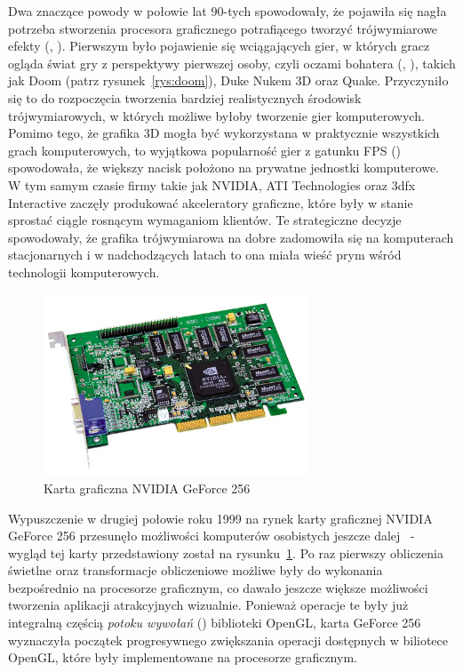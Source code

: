 Dwa znaczące powody w połowie lat 90-tych spowodowały, że pojawiła się nagła potrzeba stworzenia procesora graficznego potrafiącego tworzyć trójwymiarowe efekty (, ). Pierwszym było pojawienie się wciągających gier, w których gracz ogląda świat gry z perspektywy pierwszej osoby, czyli oczami bohatera (, ), takich jak Doom (patrz rysunek~\ref{rys:doom}), Duke Nukem 3D oraz Quake. Przyczyniło się to do rozpoczęcia tworzenia bardziej realistycznych środowisk trójwymiarowych, w których możliwe byłoby tworzenie gier komputerowych. Pomimo tego, że grafika 3D mogła być wykorzystana w praktycznie wszystkich grach komputerowych, to wyjątkowa popularność gier z gatunku FPS () spowodowała, że większy nacisk położono na prywatne jednostki komputerowe. W tym samym czasie firmy takie jak NVIDIA, ATI Technologies oraz 3dfx Interactive zaczęły produkować akceleratory graficzne, które były w stanie sprostać ciągle rosnącym wymaganiom klientów. Te strategiczne decyzje spowodowały, że grafika trójwymiarowa na dobre zadomowiła się na komputerach stacjonarnych i w nadchodzących latach to ona miała wieść prym wśród technologii komputerowych.

\begin{figure}[ht]
\centering\includegraphics[width=0.7\textwidth]{figures/03/geforce-256.jpg}
\caption{Karta graficzna NVIDIA GeForce 256}\label{rys:gf256}
\end{figure}

Wypuszczenie w drugiej połowie roku 1999 na rynek karty graficznej NVIDIA GeForce 256 przesunęło możliwości komputerów osobistych jeszcze dalej~\cite{nvidia:geforce256} - wygląd tej karty przedstawiony został na rysunku~\ref{rys:gf256}. Po raz pierwszy obliczenia świetlne oraz transformacje obliczeniowe możliwe były do wykonania bezpośrednio na procesorze graficznym, co dawało jeszcze większe możliwości tworzenia aplikacji atrakcyjnych wizualnie. Ponieważ operacje te były już integralną częścią \emph{potoku wywołań} () biblioteki OpenGL, karta GeForce 256 wyznaczyła początek progresywnego zwiększania operacji dostępnych w biliotece OpenGL, które były implementowane na procesorze graficznym.

